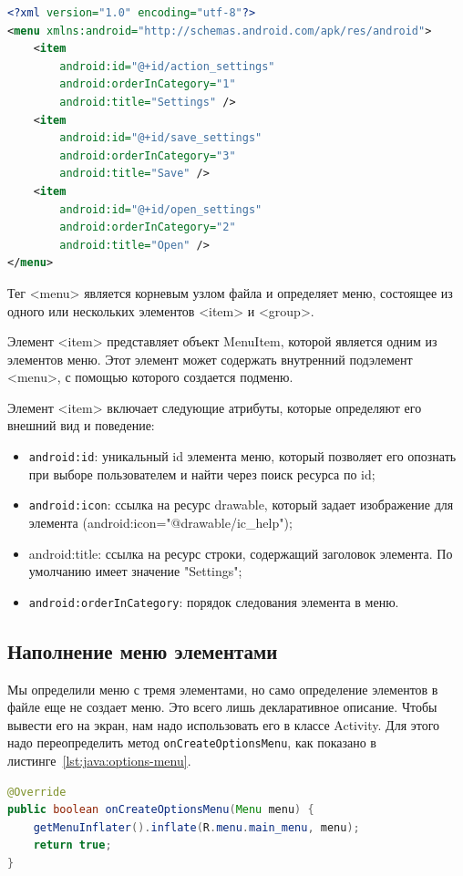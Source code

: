 \begin{lstlisting}[language=XML
	, label=lst:xml:menu
	]
<?xml version="1.0" encoding="utf-8"?>
<menu xmlns:android="http://schemas.android.com/apk/res/android">
    <item
        android:id="@+id/action_settings"
        android:orderInCategory="1"
        android:title="Settings" />
    <item
        android:id="@+id/save_settings"
        android:orderInCategory="3"
        android:title="Save" />
    <item
        android:id="@+id/open_settings"
        android:orderInCategory="2"
        android:title="Open" />
</menu>
\end{lstlisting}

Тег <menu> является корневым узлом файла и определяет меню, состоящее
из одного или нескольких элементов <item> и <group>.\par
Элемент <item> представляет объект MenuItem, которой является одним из
элементов меню. Этот элемент может содержать внутренний подэлемент
<menu>, с помощью которого создается подменю.\par
Элемент <item> включает следующие атрибуты, которые определяют его
внешний вид и поведение:

\begin{itemize}
	\item \texttt{android:id}: уникальный id элемента меню, который позволяет
		его опознать при выборе пользователем и найти через поиск
		ресурса по id;
	\item \texttt{android:icon}: ссылка на ресурс drawable, который задает
		изображение для элемента (android:icon="@drawable/ic\_help");
	\item android:title: ссылка на ресурс строки, содержащий заголовок
		элемента. По умолчанию имеет значение "Settings";
	\item \texttt{android:orderInCategory}: порядок следования элемента
		в меню.
\end{itemize}

\subsection{Наполнение меню элементами}
Мы определили меню с тремя элементами, но само определение элементов в
файле еще не создает меню. Это всего лишь декларативное описание. Чтобы
вывести его на экран, нам надо использовать его в классе Activity. Для этого
надо переопределить метод \texttt{onCreateOptionsMenu},
как показано в листинге~\ref{lst:java:options-menu}.

\begin{lstlisting}[language=Java
	, label=lst:java:options-menu
	]
@Override
public boolean onCreateOptionsMenu(Menu menu) {
	getMenuInflater().inflate(R.menu.main_menu, menu);
	return true;
}
\end{lstlisting}

